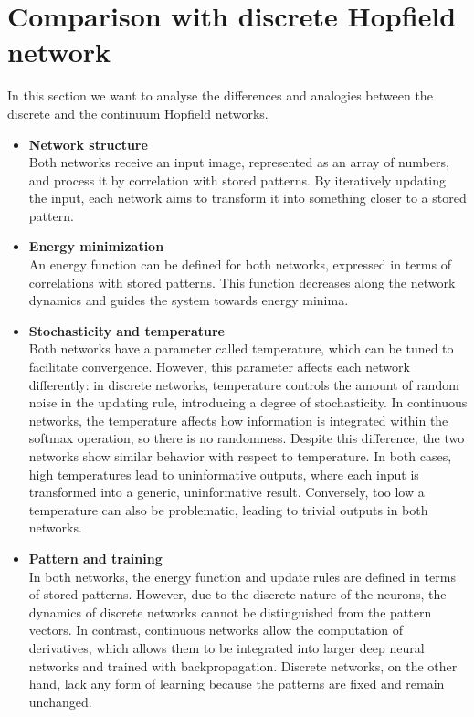 \section{Comparison with discrete Hopfield network}
In this section we want to analyse the differences and analogies between the discrete and the continuum Hopfield networks.
\begin{itemize}
	\item \textbf{Network structure}\\
	Both networks receive an input image, represented as an array of numbers, and process it by correlation with stored patterns. By iteratively updating the input, each network aims to transform it into something closer to a stored pattern.
	\item \textbf{Energy minimization}\\
	An energy function can be defined for both networks, expressed in terms of correlations with stored patterns. This function decreases along the network dynamics and guides the system towards energy minima.
	\item \textbf{Stochasticity and temperature} \\
	Both networks have a parameter called temperature, which can be tuned to facilitate convergence. However, this parameter affects each network differently: in discrete networks, temperature controls the amount of random noise in the updating rule, introducing a degree of stochasticity. In continuous networks, the temperature affects how information is integrated within the softmax operation, so there is no randomness. Despite this difference, the two networks show similar behavior with respect to temperature. In both cases, high temperatures lead to uninformative outputs, where each input is transformed into a generic, uninformative result. Conversely, too low a temperature can also be problematic, leading to trivial outputs in both networks.
	\item \textbf{Pattern and training}\\
	In both networks, the energy function and update rules are defined in terms of stored patterns. However, due to the discrete nature of the neurons, the dynamics of discrete networks cannot be distinguished from the pattern vectors. In contrast, continuous networks allow the computation of derivatives, which allows them to be integrated into larger deep neural networks and trained with backpropagation. Discrete networks, on the other hand, lack any form of learning because the patterns are fixed and remain unchanged.
\end{itemize}
